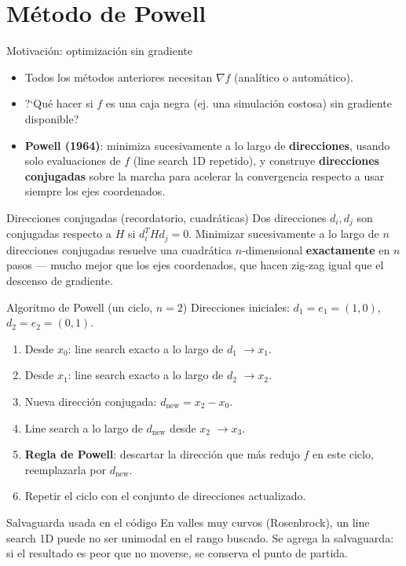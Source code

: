 \documentclass[aspectratio=169]{beamer}
\newcommand{\grad}{\nabla}
\begin{document}
\section{M\'etodo de Powell}

\begin{frame}{Motivaci\'on: optimizaci\'on sin gradiente}
  \begin{itemize}
    \item Todos los m\'etodos anteriores necesitan $\grad f$ (anal\'itico o autom\'atico).
    \item ?`Qu\'e hacer si $f$ es una caja negra (ej. una simulaci\'on costosa) sin gradiente disponible?
    \item \textbf{Powell (1964)}: minimiza sucesivamente a lo largo de \textbf{direcciones}, usando solo evaluaciones de $f$ (line search 1D repetido), y construye \textbf{direcciones conjugadas} sobre la marcha para acelerar la convergencia respecto a usar siempre los ejes coordenados.
  \end{itemize}
  \begin{block}{Direcciones conjugadas (recordatorio, cuadr\'aticas)}
    Dos direcciones $d_i, d_j$ son conjugadas respecto a $H$ si $d_i^T H d_j = 0$. Minimizar sucesivamente a lo largo de $n$ direcciones conjugadas resuelve una cuadr\'atica $n$-dimensional \textbf{exactamente} en $n$ pasos --- mucho mejor que los ejes coordenados, que hacen zig-zag igual que el descenso de gradiente.
  \end{block}
\end{frame}

\begin{frame}{Algoritmo de Powell (un ciclo, $n=2$)}
  Direcciones iniciales: $d_1=e_1=(1,0)$, $d_2=e_2=(0,1)$.
  \begin{enumerate}
    \item Desde $x_0$: line search exacto a lo largo de $d_1$ $\to x_1$.
    \item Desde $x_1$: line search exacto a lo largo de $d_2$ $\to x_2$.
    \item Nueva direcci\'on conjugada: $d_{\text{new}} = x_2 - x_0$.
    \item Line search a lo largo de $d_{\text{new}}$ desde $x_2$ $\to x_3$.
    \item \textbf{Regla de Powell}: descartar la direcci\'on que m\'as redujo $f$ en este ciclo, reemplazarla por $d_{\text{new}}$.
    \item Repetir el ciclo con el conjunto de direcciones actualizado.
  \end{enumerate}
  \begin{alertblock}{Salvaguarda usada en el c\'odigo}
    En valles muy curvos (Rosenbrock), un line search 1D puede no ser unimodal en el rango buscado. Se agrega la salvaguarda: si el resultado es peor que no moverse, se conserva el punto de partida.
  \end{alertblock}
\end{frame}
\end{document}
